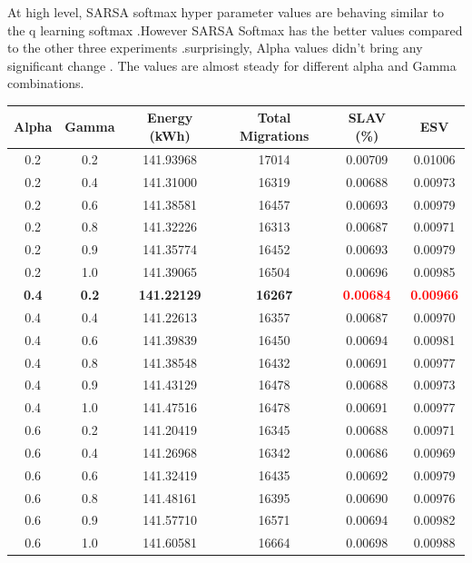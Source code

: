\documentclass[a4paper,12pt]{Classes/RoboticsLaTeX}
\begin{document}
        At high level, SARSA softmax  hyper parameter values are behaving similar to the q learning softmax .However SARSA Softmax has the better values compared to the other three experiments .surprisingly, Alpha values didn't bring any significant change . The values are almost steady for different alpha and Gamma combinations.

        \begin{table}[H]
        \centering
        \small
        \begin{tabular}{|c|c|c|c|c|c|}
        \hline
        \textbf{Alpha} & \textbf{Gamma} & \textbf{Energy (kWh)} & \textbf{Total Migrations} & \textbf{SLAV (\%)} & \textbf{ESV} \\ 
        \hline
        0.2 & 0.2 & 141.93968 & 17014 & 0.00709 & 0.01006 \\ 
        0.2 & 0.4 & 141.31000 & 16319 & 0.00688 & 0.00973 \\ 
        0.2 & 0.6 & 141.38581 & 16457 & 0.00693 & 0.00979 \\ 
        0.2 & 0.8 & 141.32226 & 16313 & 0.00687 & 0.00971 \\ 
        0.2 & 0.9 & 141.35774 & 16452 & 0.00693 & 0.00979 \\ 
        0.2 & 1.0 & 141.39065 & 16504 & 0.00696 & 0.00985 \\ 
        \textbf{0.4} & \textbf{0.2} & \textbf{141.22129} & \textbf{16267} & \textbf{\textcolor{red}{0.00684}} & \textbf{\textcolor{red}{0.00966}} \\ 
        0.4 & 0.4 & 141.22613 & 16357 & 0.00687 & 0.00970 \\ 
        0.4 & 0.6 & 141.39839 & 16450 & 0.00694 & 0.00981 \\ 
        0.4 & 0.8 & 141.38548 & 16432 & 0.00691 & 0.00977 \\ 
        0.4 & 0.9 & 141.43129 & 16478 & 0.00688 & 0.00973 \\ 
        0.4 & 1.0 & 141.47516 & 16478 & 0.00691 & 0.00977 \\ 
        0.6 & 0.2 & 141.20419 & 16345 & 0.00688 & 0.00971 \\ 
        0.6 & 0.4 & 141.26968 & 16342 & 0.00686 & 0.00969 \\ 
        0.6 & 0.6 & 141.32419 & 16435 & 0.00692 & 0.00979 \\ 
        0.6 & 0.8 & 141.48161 & 16395 & 0.00690 & 0.00976 \\ 
        0.6 & 0.9 & 141.57710 & 16571 & 0.00694 & 0.00982 \\ 
        0.6 & 1.0 & 141.60581 & 16664 & 0.00698 & 0.00988 \\ 

\end{tabular}
\end{table}
\end{document}
